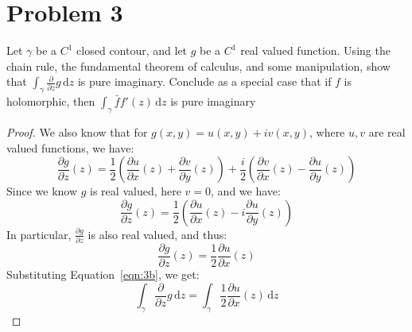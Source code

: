 \documentclass{article}[12pt]
\def\D{\mathrm{d}}
\begin{document}
\section*{Problem 3} Let $\gamma$ be a $C^1$ closed contour, and let
$g$ be a $C^1$ real valued function. Using the chain rule, the fundamental
theorem of calculus, and some manipulation, show that
$\int_\gamma \frac{\partial}{\partial z}g\,\D z$ is pure imaginary. Conclude
as a special case that if $f$ is holomorphic, then $\int_\gamma \bar{f}f'(z)\,\D z$
is pure imaginary
\begin{proof}
  We also know that for $g(x,y)=u(x,y)+iv(x,y)$, where $u,v$ are real
  valued functions, we have:
  \[
  \frac{\partial g}{\partial z}(z) = \frac{1}{2}\left(\frac{\partial u}
       {\partial x}(z) + \frac{\partial v}{\partial y}(z)\right) + \frac{i}{2}
       \left(\frac{\partial v}{\partial x}(z) - \frac{\partial u}{\partial y}(z)
       \right)
       \]
       Since we know $g$ is real valued, here $v=0$, and we have:
       \[
  \frac{\partial g}{\partial z}(z) = \frac{1}{2}\left(\frac{\partial u}
       {\partial x}(z) -i\frac{\partial u}{\partial y}(z)
       \right)
       \]
       In particular, $\frac{\partial g}{\partial z}$ is also real valued,
       and thus:
       \begin{equation}
         \frac{\partial g}{\partial z}(z) =
         \frac{1}{2}\frac{\partial u}{\partial x}(z) \label{eqn:3b}
       \end{equation}
       Substituting Equation~\ref{eqn:3b}, we get:
       \begin{equation}
         \int_\gamma \frac{\partial}{\partial z}g\,\D z =
         \int_\gamma  \frac{1}{2}\frac{\partial u}{\partial x}(z) \,\D z 

\end{equation}
\end{proof}
\end{document}
